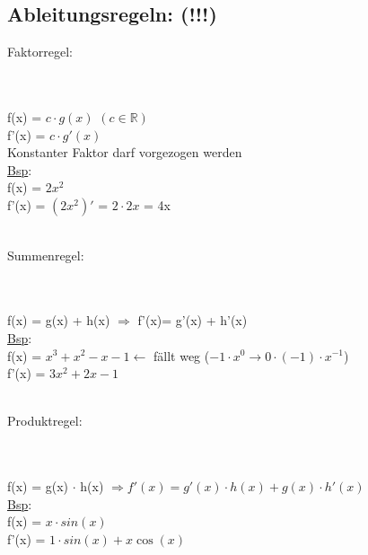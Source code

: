 \documentclass[../mainfile.tex]{subfiles}
\begin{document}
	\subsection{Ableitungsregeln: (!!!)}
	\begin{enumerate}
		{\large\item[i)] Faktorregel:} \\\\
		f(x) = $c \cdot g(x)$	\qquad	$(c \in \mathbb{R})$ \\
		f'(x) = $c \cdot g'(x)$ \\
		Konstanter Faktor darf vorgezogen werden \\
		\underline{Bsp}: \\ 
		f(x) = $2x^2$ \\
		f'(x) = $(2x^2)'$ = $2 \cdot 2x$ = 4x \\\\
		
		{\large\item[ii)] Summenregel:} \\\\
		f(x) = g(x) + h(x) $\Rightarrow$ f'(x)= g'(x) + h'(x) \\
		\underline{Bsp}: \\ 
		f(x) = $x^3+x^2-x-1 \leftarrow$ fällt weg ($-1 \cdot x^0 \rightarrow 0 \cdot (-1) \cdot x^{-1}$) \\
		f'(x) = $3x^2+2x-1$	\\\\
		
		{\large\item[iii)] Produktregel:} \\\\ 
		f(x) = g(x) $\cdot$ h(x) $\Rightarrow f'(x)= g'(x) \cdot h(x) + g(x) \cdot h'(x)$ \\
		\underline{Bsp}: \\ 
		f(x) = $x \cdot sin(x)$ \\
		f'(x) = $1 \cdot sin(x) + x \cos(x)$
		
	\end{enumerate}
\end{document}
